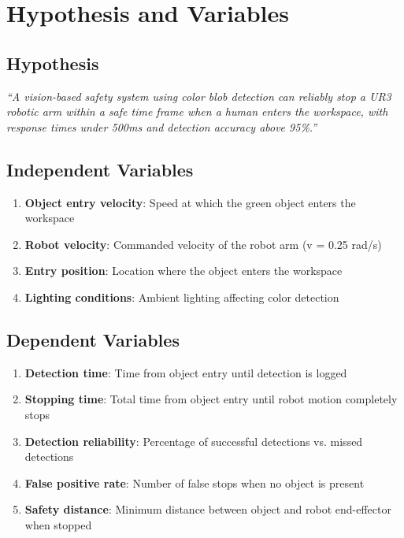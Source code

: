 \documentclass[11pt,letterpaper]{article}
\begin{document}
\section{Hypothesis and Variables}

\subsection{Hypothesis}

\textit{``A vision-based safety system using color blob detection can reliably stop a UR3 robotic arm within a safe time frame when a human enters the workspace, with response times under 500ms and detection accuracy above 95\%.''}

\subsection{Independent Variables}

\begin{enumerate}[leftmargin=*]
    \item \textbf{Object entry velocity}: Speed at which the green object enters the workspace
    \item \textbf{Robot velocity}: Commanded velocity of the robot arm (v = 0.25 rad/s)
    \item \textbf{Entry position}: Location where the object enters the workspace
    \item \textbf{Lighting conditions}: Ambient lighting affecting color detection
\end{enumerate}

\subsection{Dependent Variables}

\begin{enumerate}[leftmargin=*]
    \item \textbf{Detection time}: Time from object entry until detection is logged
    \item \textbf{Stopping time}: Total time from object entry until robot motion completely stops
    \item \textbf{Detection reliability}: Percentage of successful detections vs. missed detections
    \item \textbf{False positive rate}: Number of false stops when no object is present
    \item \textbf{Safety distance}: Minimum distance between object and robot end-effector when stopped
\end{enumerate}
\end{document}
